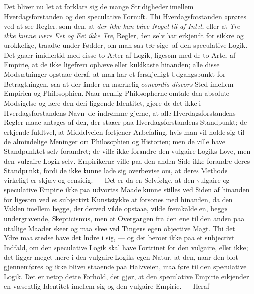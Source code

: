 \documentclass[12pt]{book}
\newcommand{\opage}[1]{\marginnote{\footnotesize\textit{[#1]}}}
\begin{document}
Det bliver nu let at forklare sig de mange Stridigheder imellem
Hverdagsforstanden og den speculative Fornuft. Thi Hverdagsforstanden
oprøres ved at see Regler, som den, at \emph{der ikke kan blive Noget
til af Intet}, eller at \emph{Tre ikke kunne være Eet og Eet ikke
Tre}, Regler, den selv har erkjendt for sikkre og urokkelige, traadte
under Fødder, om man saa tør sige, af den speculative Logik. Det gaaer
imidlertid med disse to Arter af Logik, ligesom med de to Arter af
Empirie, at de ikke ligefrem ophæve eller kuldkaste hinanden; alle
disse Modsætninger opstaae deraf, at man har et forskjelligt
Udgangspunkt for Betragtningen, saa at der finder en mærkelig
\textit{concordia discors} Sted imellem Empirien og Philosophien. Naar
nemlig Philosopherne omtale den absolute Modsigelse og lære den deri
liggende Identitet, gjøre de det ikke i Hverdagsforstandens Navn; de
indrømme gjerne, at
\opage{29} alle Hverdagsforstandens Regler maae antages af den, der staaer paa
Hverdagsforstandens Standpunkt; de erkjende fuldtvel, at Middelveien
fortjener Anbefaling, hvis man vil holde sig til de almindelige
Meninger om Philosophien og Historien; men de ville have Standpunktet
selv forandret; de ville ikke forandre den vulgaire Logiks Love, men
den vulgaire Logik selv. Empirikerne ville paa den anden Side ikke
forandre deres Standpunkt, fordi de ikke kunne lade sig overbevise om,
at deres Methode virkeligt er skjæv og eensidig. --- Det er da en
Selvfølge, at den vulgaire og speculative Empirie ikke paa udvortes
Maade kunne stilles ved Siden af hinanden for ligesom ved et
subjectivt Kunststykke at forsones med hinanden, da den Vaklen imellem
begge, der derved vilde opstaae, vilde fremkalde en, begge
undergravende, Skepticismus, men at Overgangen fra den ene til den
anden paa utallige Maader skeer og maa skee ved Tingens egen objective
Magt. Thi det Ydre maa stedse have det Indre i sig, --- og det beroer
ikke paa et subjectivt Indfald, om den speculative Logik skal have
Fortrinet for den vulgaire, eller ikke; det ligger meget mere i den
vulgaire Logiks egen Natur, at den, naar den blot gjennemføres og ikke
bliver staaende paa Halvveien, maa føre til den speculative Logik. Det
er netop dette Forhold, der gjør, at den speculative Empirie erkjender
en væsentlig Identitet imellem sig og den vulgaire Empirie. --- Heraf
\end{document}
